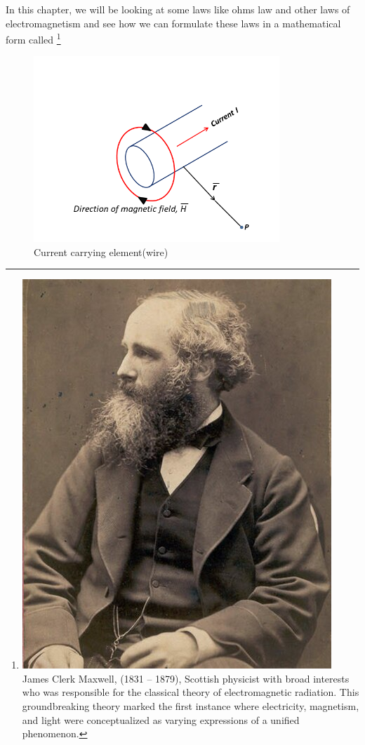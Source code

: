 In this chapter, we will be looking at some laws like ohms law and other laws of electromagnetism and see how we can formulate these laws in a mathematical form called 
\footnote{\includegraphics[scale=0.1]{graphics/maxwell}
James Clerk Maxwell, (1831 – 1879), Scottish physicist with broad interests who was responsible for the classical theory of electromagnetic radiation. This groundbreaking theory marked the first instance where electricity, magnetism, and light were conceptualized as varying expressions of a unified phenomenon.
}
\begin{figure}[h]
	\centering
	\includegraphics[height=7cm]{graphics/currentElement}
	\caption{Current carrying element(wire)}
	\label{fig 5.1:currentelement}
\end{figure}

